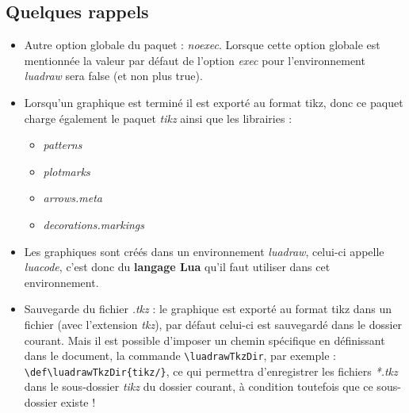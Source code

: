 \documentclass[%
10pt,%
a4paper,%
french,%
]%
{article}%
\def\luadrawTkzDir{tkz3d/}%
\begin{document}
\subsection{Quelques rappels}

\begin{itemize}
    \item Autre option globale du paquet : \emph{noexec}. Lorsque cette option globale est mentionnée la valeur par défaut de l'option \emph{exec} pour l'environnement \emph{luadraw} sera false (et non plus true).

    \item Lorsqu'un graphique est terminé il est exporté au format tikz, donc ce paquet charge également le paquet \emph{tikz} ainsi que les librairies :
    \begin{itemize}
        \item\emph{patterns}
        \item\emph{plotmarks}
        \item\emph{arrows.meta}
        \item\emph{decorations.markings}
        \end{itemize}
    \item Les graphiques sont créés dans un environnement \emph{luadraw}, celui-ci appelle \emph{luacode}, c'est donc du \textbf{langage Lua} qu'il faut utiliser dans cet environnement.

    \item Sauvegarde du fichier \emph{.tkz} : le graphique est exporté au format tikz dans un fichier (avec l'extension \emph{tkz}), par défaut celui-ci est sauvegardé dans le dossier courant. Mais il est possible d'imposer un chemin spécifique en définissant dans le document, la commande \verb|\luadrawTkzDir|, par exemple : \verb|\def\luadrawTkzDir{tikz/}|, ce qui permettra d'enregistrer les fichiers \emph{*.tkz} dans le sous-dossier \emph{tikz} du dossier courant, à condition toutefois que ce sous-dossier existe !


\end{itemize}
\end{document}
